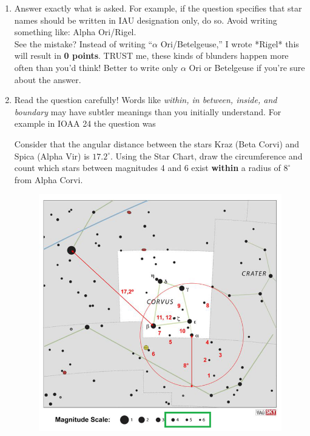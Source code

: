 \documentclass[a4paper,12pt]{extarticle}
\begin{document}
\begin{enumerate}
	\item \textsf{Answer exactly what is asked.} For example, if the question specifies that star names should be written in IAU designation only, do so. Avoid writing something like: Alpha Ori/Rigel. \\
	
	See the mistake? Instead of writing “$\alpha$ Ori/Betelgeuse,” I wrote *Rigel* this will result in \textbf{0 points}. TRUST me, these kinds of blunders happen more often than you’d think! Better to write only $\alpha$ Ori or Betelgeuse if you're sure about the answer.
	\item \textsf{Read the question carefully!} Words like \textit{within, in between, inside, and boundary} may have subtler meanings than you initially understand. For example in IOAA 24 the question was

\begin{pro}
	Consider that the angular distance between the stars Kraz (Beta Corvi) and Spica (Alpha Vir) is $17.2^\circ$.
	Using the Star Chart, draw the circumference and count which
	stars between magnitudes 4 and 6 exist \textbf{within} a radius of $8^\circ$ from Alpha Corvi.
\end{pro}
\begin{sol}
	\begin{figure}[H]
		\centering
		\includegraphics[width=0.8\linewidth]{ioaa_24mag.png}
	\end{figure}
\end{sol}
	

\end{enumerate}
\end{document}
